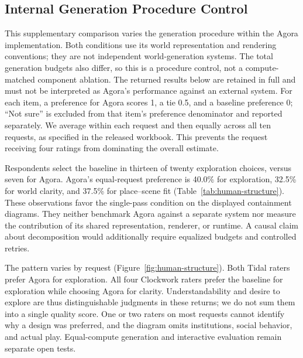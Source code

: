 \subsection{Internal Generation Procedure Control}
\label{app:internal-generation}
This supplementary comparison varies the generation procedure within the
Agora implementation. Both conditions use its world representation and
rendering conventions; they are not independent world-generation systems.
The total generation budgets also differ, so this is a procedure control,
not a compute-matched component ablation. The returned results below are
retained in full and must not be interpreted as Agora's performance against
an external system.
For each item, a preference for Agora scores 1, a tie 0.5, and a baseline
preference 0; ``Not sure'' is excluded from that item's preference denominator
and reported separately. We average within each request and then equally
across all ten requests, as specified in the released workbook. This prevents
the request receiving four ratings from dominating the overall estimate.

\begin{table}[t]
\centering\small
\setlength{\tabcolsep}{3.2pt}

\caption{Structure judgments from ten eligible returns. Full and Base denote Agora
and the single-pass baseline, irrespective of randomized A/B labels; ? = Not
sure. Counts pool twenty comparisons per item. Score is Agora's
\emph{equal-request} mean, not a pooled vote fraction.
No population superiority is inferred from these small counts.}
\label{tab:human-structure}
\end{table}

Respondents select the baseline in thirteen of twenty exploration choices,
versus seven for Agora. Agora's equal-request preference is 40.0\% for
exploration, 32.5\% for world clarity, and 37.5\% for place--scene fit
(Table~\ref{tab:human-structure}). These observations favor the single-pass condition on the displayed
containment diagrams. They neither benchmark Agora against a separate system
nor measure the contribution of its shared representation, renderer, or
runtime. A causal claim about decomposition would additionally require
equalized budgets and controlled retries.

The pattern varies by request (Figure~\ref{fig:human-structure}). Both Tidal
raters prefer Agora for exploration. All four Clockwork raters prefer the
baseline for exploration while choosing Agora for clarity. Understandability
and desire to explore are thus distinguishable judgments in these returns;
we do not sum them into a single quality score. One or two raters on most
requests cannot identify why a design was preferred, and the diagram omits
institutions, social behavior, and actual play. Equal-compute generation and
interactive evaluation remain separate open tests.

